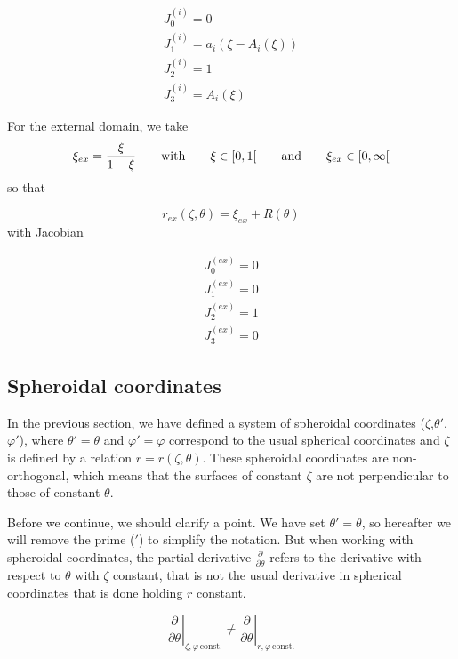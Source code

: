 \begin{equation}
\begin{array}{l}
J_0^{(i)}=0\\
J_1^{(i)}=a_i(\xi-A_i(\xi))\\
J_2^{(i)}=1\\
J_3^{(i)}=A_i(\xi)
\end{array}
\end{equation}

For the external domain, we take 
\begin{equation}
\xi_{ex}=\frac{\xi}{1-\xi} {\qquad {\rm with}\qquad} \xi\in[0,1[ \qquad {\rm and}\qquad \xi_{ex}\in[0,\infty[
\end{equation}
so that

\begin{equation}
r_{ex}(\zeta,\theta)=\xi_{ex}+R(\theta)
\end{equation}
with Jacobian

\begin{equation}
\begin{array}{l}
J_0^{(ex)}=0\\
J_1^{(ex)}=0\\
J_2^{(ex)}=1\\
J_3^{(ex)}=0
\end{array}
\end{equation}

\subsection{Spheroidal coordinates}

In the previous section, we have defined a system of spheroidal
coordinates ($\zeta$,$\theta'$,$\varphi'$), where $\theta'=\theta$ and
$\varphi'=\varphi$ correspond to the usual spherical coordinates and
$\zeta$ is defined by a relation $r=r(\zeta,\theta)$. These spheroidal
coordinates are non-orthogonal, which means that the surfaces of constant
$\zeta$ are not perpendicular to those of constant $\theta$.

Before we continue, we should clarify a point. We have set
$\theta'=\theta$, so hereafter we will remove the prime ($'$) to simplify
the notation. But when working with spheroidal coordinates, the partial
derivative $\frac{\partial}{\partial\theta}$ refers to the derivative
with respect to $\theta$ with $\zeta$ constant, that is not the usual
derivative in spherical coordinates that is done holding $r$ constant.

$$\left.\frac{\partial}{\partial\theta}\right|_{\zeta,\varphi\,\mathrm{const.}}\ne
\left.\frac{\partial}{\partial\theta}\right|_{r,\varphi\,\mathrm{const.}}$$

